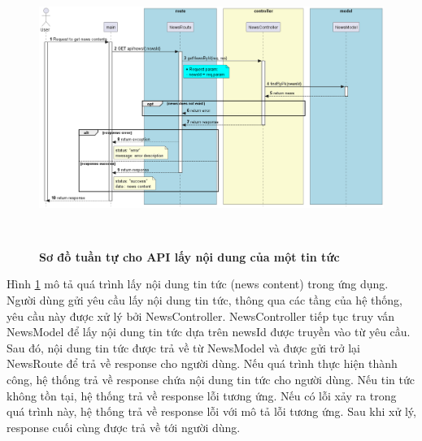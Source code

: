 \begin{enumerate}[a)]
\begin{figure}[H]
  \centering
  \includegraphics[width=16cm,height=9cm]{Images/server/sequence/server/getNewsById.png}
  \caption[Sơ đồ tuần tự cho API lấy nội dung của một tin tức ]{\bfseries \fontsize{12pt}{0pt}
  \selectfont Sơ đồ tuần tự cho API lấy nội dung của một tin tức }
  \label{getNewsById} %
\end{figure}
Hình \ref{getNewsById} mô tả quá trình lấy nội dung tin tức (news content) trong ứng dụng. Người dùng gửi yêu cầu lấy nội dung tin tức, thông qua các tầng của hệ thống, yêu cầu này được xử lý bởi NewsController. NewsController tiếp tục truy vấn NewsModel để lấy nội dung tin tức dựa trên newsId được truyền vào từ yêu cầu. Sau đó, nội dung tin tức được trả về từ NewsModel và được gửi trở lại NewsRoute để trả về response cho người dùng. Nếu quá trình thực hiện thành công, hệ thống trả về response chứa nội dung tin tức cho người dùng. Nếu tin tức không tồn tại, hệ thống trả về response lỗi tương ứng. Nếu có lỗi xảy ra trong quá trình này, hệ thống trả về response lỗi với mô tả lỗi tương ứng. Sau khi xử lý, response cuối cùng được trả về tới người dùng.


\end{enumerate}
